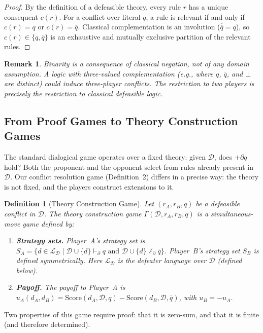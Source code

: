 \documentclass{article}
\newtheorem{definition}{Definition}
\newtheorem{remark}{Remark}
\newcommand{\D}{\mathcal{D}}
\newcommand{\Score}{\mathrm{Score}}
\newcommand{\comp}[1]{\overline{#1}}
\begin{document}
\begin{proof}
By the definition of a defeasible theory, every rule $r$ has a unique consequent $c(r)$. For a conflict over literal $q$, a rule is relevant if and only if $c(r) = q$ or $c(r) = \comp{q}$. Classical complementation is an involution ($\comp{\comp{q}} = q$), so $c(r) \in \{q, \comp{q}\}$ is an exhaustive and mutually exclusive partition of the relevant rules.
\end{proof}
 
\begin{remark}
Binarity is a consequence of classical negation, not of any domain assumption. A logic with three-valued complementation (e.g., where $q$, $\comp{q}$, and $\bot$ are distinct) could induce three-player conflicts. The restriction to two players is precisely the restriction to classical defeasible logic.
\end{remark}
 
\subsection{From Proof Games to Theory Construction Games}
 
The standard dialogical game operates over a fixed theory: given $\D$, does $+\partial q$ hold? Both the proponent and the opponent select from rules already present in $\D$. Our conflict resolution game (Definition~2) differs in a precise way: the theory is not fixed, and the players construct extensions to it.
 
\begin{definition}[Theory Construction Game]
Let $(r_A, r_B, q)$ be a defeasible conflict in $\D$. The theory construction game $\Gamma(\D, r_A, r_B, q)$ is a simultaneous-move game defined by:
\begin{enumerate}[nosep]
    \item \textbf{Strategy sets.} Player~A's strategy set is $S_A = \{d \in \mathcal{L}_\D \mid \D \cup \{d\} \vdash_\partial q \text{ and } \D \cup \{d\} \not\vdash_\partial \comp{q}\}$. Player~B's strategy set $S_B$ is defined symmetrically. Here $\mathcal{L}_\D$ is the defeater language over $\D$ (defined below).
    \item \textbf{Payoff.} The payoff to Player~A is $u_A(d_A, d_B) = \Score(d_A, \D, q) - \Score(d_B, \D, \comp{q})$, with $u_B = -u_A$.
\end{enumerate}
\end{definition}
 
Two properties of this game require proof: that it is zero-sum, and that it is finite (and therefore determined).
 
\end{document}
